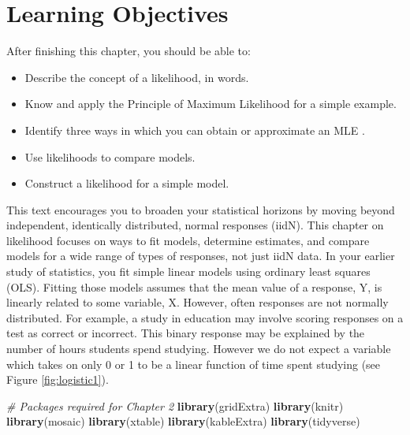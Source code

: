 \documentclass[
]{krantz}
\newenvironment{Shaded}{\begin{snugshade}}{\end{snugshade}}
\newcommand{\CommentTok}[1]{\textcolor[rgb]{0.37,0.37,0.37}{\textit{#1}}}
\newcommand{\KeywordTok}[1]{\textcolor[rgb]{0.27,0.27,0.27}{\textbf{#1}}}
\newcommand{\NormalTok}[1]{#1}
\providecommand{\tightlist}{%
  \setlength{\itemsep}{0pt}\setlength{\parskip}{0pt}}
\begin{document}
\hypertarget{learning-objectives-1}{%
\section{Learning Objectives}\label{learning-objectives-1}}

After finishing this chapter, you should be able to:

\begin{itemize}
\tightlist
\item
  Describe the concept of a likelihood, in words.
\item
  Know and apply the Principle of Maximum Likelihood for a simple example.
\item
  Identify three ways in which you can obtain or approximate an MLE .
\item
  Use likelihoods to compare models.
\item
  Construct a likelihood for a simple model.
\end{itemize}

This text encourages you to broaden your statistical horizons by moving beyond independent, identically distributed, normal responses (iidN). This chapter on likelihood focuses on ways to fit models, determine estimates, and compare models for a wide range of types of responses, not just iidN data. In your earlier study of statistics, you fit simple linear models using ordinary least squares (OLS). Fitting those models assumes that the mean value of a response, Y, is linearly related to some variable, X. However, often responses are not normally distributed. For example, a study in education may involve scoring responses on a test as correct or incorrect. This binary response may be explained by the number of hours students spend studying. However we do not expect a variable which takes on only 0 or 1 to be a linear function of time spent studying (see Figure \ref{fig:logistic1}).

\begin{Shaded}
\begin{Highlighting}[]
\CommentTok{# Packages required for Chapter 2}
\KeywordTok{library}\NormalTok{(gridExtra)  }
\KeywordTok{library}\NormalTok{(knitr) }
\KeywordTok{library}\NormalTok{(mosaic)}
\KeywordTok{library}\NormalTok{(xtable)}
\KeywordTok{library}\NormalTok{(kableExtra)}
\KeywordTok{library}\NormalTok{(tidyverse) }
\end{Highlighting}
\end{Shaded}
\end{document}
